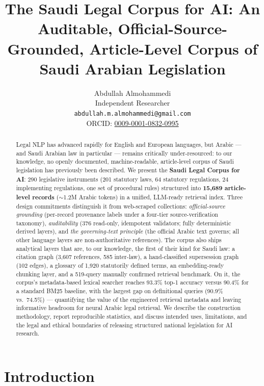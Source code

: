 \documentclass[11pt]{article}
\title{The Saudi Legal Corpus for AI: An Auditable, Official-Source-Grounded,
Article-Level Corpus of Saudi Arabian Legislation}
\author{Abdullah Almohammedi \\
  Independent Researcher \\
  \texttt{abdullah.m.almohammedi@gmail.com} \\
  ORCID: \href{https://orcid.org/0009-0001-0832-0995}{0009-0001-0832-0995}}
\date{}
\newcommand{\usingaclstyle}{}%
\newcommand{\corpusname}{Saudi Legal Corpus for AI}
\begin{document}
\ifdefined\usingaclstyle
  \maketitle
\else
  \twocolumn[
    \maketitle
    \vspace{-2em}
  ]
\fi

\begin{abstract}
Legal NLP has advanced rapidly for English and European languages, but
Arabic --- and Saudi Arabian law in particular --- remains critically
under-resourced: to our knowledge, no openly documented, machine-readable,
article-level corpus of Saudi legislation has previously been described. We
present the \textbf{\corpusname}: 290 legislative instruments (201 statutory
laws, 64 statutory regulations, 24 implementing regulations, one set of
procedural rules) structured into \textbf{15{,}689 article-level records}
($\sim$1.2M Arabic tokens) in a unified, LLM-ready retrieval index. Three
design commitments distinguish it from web-scraped collections:
\emph{official-source grounding} (per-record provenance labels under a
four-tier source-verification taxonomy), \emph{auditability} (376
read-only, idempotent validators; fully deterministic derived layers), and
\emph{the governing-text principle} (the official Arabic text governs; all
other language layers are non-authoritative references). The corpus also
ships analytical layers that are, to our knowledge, the first of their kind
for Saudi law: a citation graph (3{,}607 references, 585 inter-law), a
hand-classified supersession graph (102 edges), a glossary of 1{,}920
statutorily defined terms, an embedding-ready chunking layer, and a
519-query manually confirmed retrieval benchmark. On it, the corpus's
metadata-based lexical searcher reaches 93.3\% top-1 accuracy versus 90.4\%
for a standard BM25 baseline, with the largest gap on definitional queries
(90.9\% vs.\ 74.5\%) --- quantifying the value of the engineered retrieval
metadata and leaving informative headroom for neural Arabic legal
retrieval. We describe the construction methodology, report reproducible
statistics, and discuss intended uses, limitations, and the legal and
ethical boundaries of releasing structured national legislation for AI
research.
\end{abstract}

\section{Introduction}
\end{document}
